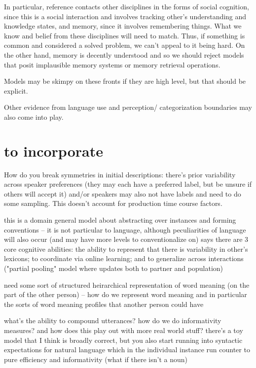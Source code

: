 \documentclass[]{article}
\begin{document}
In particular, reference contacts other disciplines in the forms of social cognition, since this is a social interaction and involves tracking other's understanding and knowledge states, and memory, since it involves remembering things. What we know and belief from these disciplines will need to match. Thus, if something is common and considered a solved problem, we can't appeal to it being hard. On the other hand, memory is decently understood and so we should reject models that posit implausible memory systems or memory retrieval operations. 

Models may be skimpy on these fronts if they are high level, but that should be explicit. 

Other evidence from language use and perception/ categorization boundaries may also come into play. 

\section{to incorporate}

\cite{hawkins2020b} How do you break symmetries in initial descriptions: there's prior variability across speaker preferences (they may each have a preferred label, but be unsure if others will accept it) and/or speakers may also not have labels and need to do some sampling. This doesn't account for production time course factors. 

this is a domain general model about abstracting over instances and forming conventions -- it is not particular to language, although peculiarities of language will also occur (and may have more levels to conventionalize on) 
\cite{hawkins2021} says there are 3 core cognitive abilities: the ability to represent that there is variability in other's lexicons; to coordinate via online learning; and to generalize across interactions ("partial pooling" model where updates both to partner and population) 



need some sort of structured heirarchical representation of word meaning (on the part of the other person) -- how do we represent word meaning and in particular the sorts of word meaning profiles that another person could have 

what's the ability to compound utterances? how do we do informativity measures? and how does this play out with more real world stuff? there's a toy model that I think is broadly correct, but you also start running into syntactic expectations for natural language which in the individual instance run counter to pure efficiency and informativity (what if there isn't a noun) 
\end{document}
